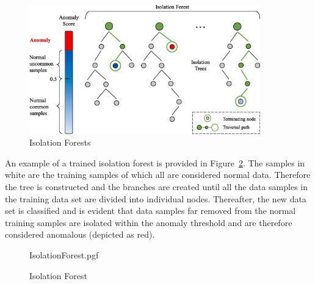 \begin{figure}[h!tb]
	\centering
	
	\includegraphics[width=10cm]{fig/Isolation_Forests} %
	
	\caption[Isolation Forest]{Isolation Forests \cite{Chen2020}}
	\label{Figure-Isolation_Forest} 
\end{figure}

An example of a trained isolation forest is provided in Figure~\ref{fig:IsolationForest}. The samples in white are the training samples of which all are considered normal data. Therefore the tree is constructed and the branches are created until all the data samples in the training data set are divided into individual nodes. Thereafter, the new data set is classified and is evident that data samples far removed from the normal training samples are isolated within the anomaly threshold and are therefore considered anomalous (depicted as red).
\begin{figure}[!hbt]
	\centering
	{IsolationForest.pgf}
	\caption{Isolation Forest}
	\label{fig:IsolationForest}
\end{figure}

